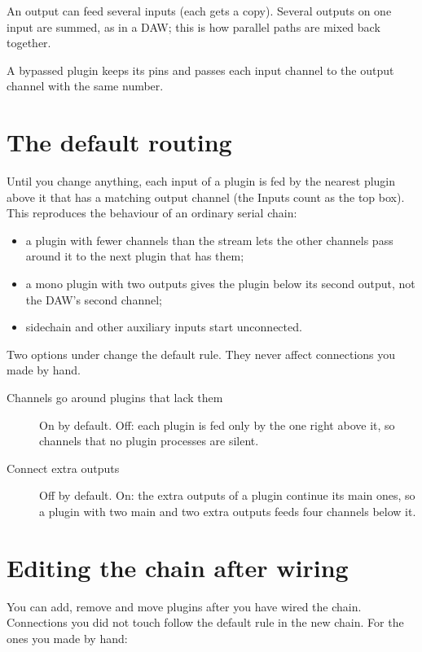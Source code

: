 An output can feed several inputs (each gets a copy). Several outputs on one
input are summed, as in a DAW; this is how parallel paths are mixed back
together.

A bypassed plugin keeps its pins and passes each input channel to the output
channel with the same number.

\section{The default routing}

Until you change anything, each input of a plugin is fed by the nearest
plugin above it that has a matching output channel (the Inputs count as the
top box). This reproduces the behaviour of an ordinary serial chain:

\begin{itemize}
  \item a plugin with fewer channels than the stream lets the other channels
    pass around it to the next plugin that has them;
  \item a mono plugin with two outputs gives the plugin below its second
    output, not the DAW's second channel;
  \item sidechain and other auxiliary inputs start unconnected.
\end{itemize}

Two options under  change the default rule. They never affect
connections you made by hand.

\begin{description}
  \item[Channels go around plugins that lack them] On by default. Off: each
    plugin is fed only by the one right above it, so channels that no plugin
    processes are silent.
  \item[Connect extra outputs] Off by default. On: the extra outputs of a
    plugin continue its main ones, so a plugin with two main and two extra
    outputs feeds four channels below it.
\end{description}

\section{Editing the chain after wiring}

You can add, remove and move plugins after you have wired the chain.
Connections you did not touch follow the default rule in the new chain. For
the ones you made by hand:

